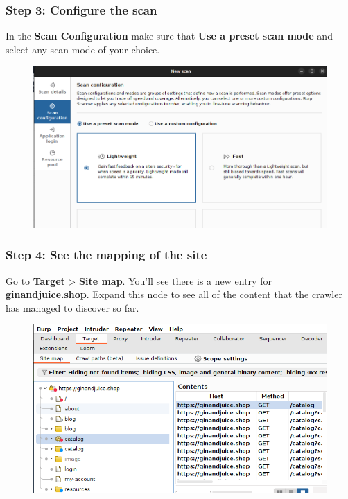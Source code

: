 \documentclass[
	a4paper, %
	12pt, %
]{CSSullivanBusinessReport}
\begin{document}
\subsubsection*{Step 3: Configure the scan}
\begin{fullwidth}
In the \textbf{Scan Configuration} make sure that \textbf{Use a preset scan mode} and select any scan mode of your choice.
\begin{figure}[H]
    \centering
    \includegraphics[width=1\linewidth]{Images//using scanner/scan configuration.png}

\end{figure}
\end{fullwidth}

\subsubsection*{Step 4: See the mapping of the site}
\begin{fullwidth}
Go to {\color{orange}\textbf{Target}} > {\color{orange}\textbf{Site map}}. You'll see there is a new entry for \textbf{ginandjuice.shop}. Expand this node to see all of the content that the crawler has managed to discover so far.
\begin{figure}[H]
    \centering
    \includegraphics[width=0.5\linewidth]{Images//using scanner/crawled_output.png}

\end{figure}
\end{fullwidth}
\end{document}
